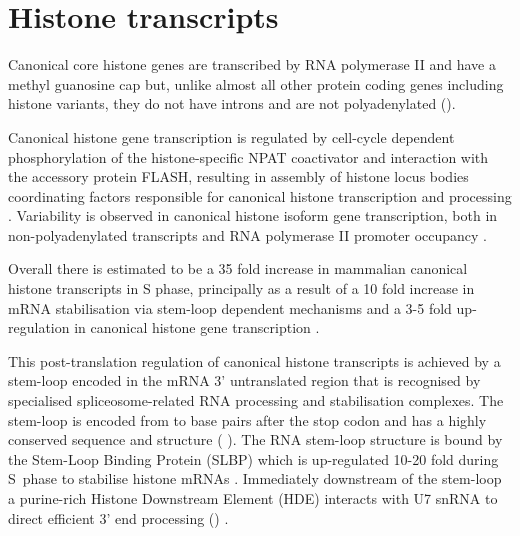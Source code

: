 \section{Histone transcripts}

  Canonical core histone genes are transcribed by RNA polymerase II
  and have a methyl guanosine cap \citep{MarzluffNatRevGen2008}
  but, unlike almost all other protein coding genes including histone variants,
  they do not have introns and are not polyadenylated ().

  Canonical histone gene transcription is regulated
  by cell-cycle dependent phosphorylation of the histone-specific NPAT coactivator
  and interaction with the accessory protein FLASH,
  resulting in assembly of histone locus bodies
  coordinating factors responsible for canonical histone transcription and processing
  \citep{MarzluffNatRevGen2008,RattrayMueller2012,Hoefig2014}.
  Variability is observed in canonical histone isoform gene transcription,
  both in non-polyadenylated transcripts \citep{YangGenomeBiol2011}
  and RNA polymerase II promoter occupancy \citep{Ederveen2011}.

  Overall there is estimated to be a 35 fold increase in mammalian canonical histone transcripts in S phase,
  principally as a result of a 10 fold increase in mRNA stabilisation via stem-loop dependent mechanisms
  and a 3-5 fold up-regulation in canonical histone gene transcription \citep{HarrisMCB1991}.

  This post-translation regulation of canonical histone transcripts
  is achieved by a stem-loop encoded in the mRNA 3' untranslated region
  that is recognised by specialised spliceosome-related RNA processing and stabilisation complexes.
  The stem-loop is encoded from \StemLoopStart{} to \StemLoopEnd{} base pairs after the stop codon
  and has a highly conserved sequence and structure ( \citep{stem-loop-structure}).
  The RNA stem-loop structure is bound by the Stem-Loop Binding Protein (SLBP)
  which is up-regulated 10-20 fold during S~phase to stabilise histone mRNAs \citep{SLBP-regulation}.
  Immediately downstream of the stem-loop a purine-rich Histone Downstream Element (HDE)
  interacts with U7 snRNA to direct efficient 3' end processing () \citep{HDE-sequence}.

  \begin{figure*}
    \centering
    \hfill
  \end{figure*}


